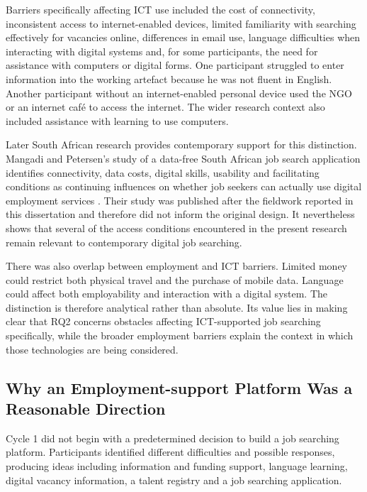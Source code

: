 Barriers specifically affecting ICT use included the cost of connectivity, inconsistent access to internet-enabled devices, limited familiarity with searching effectively for vacancies online, differences in email use, language difficulties when interacting with digital systems and, for some participants, the need for assistance with computers or digital forms. One participant struggled to enter information into the working artefact because he was not fluent in English. Another participant without an internet-enabled personal device used the NGO or an internet café to access the internet. The wider research context also included assistance with learning to use computers.

Later South African research provides contemporary support for this distinction. Mangadi and Petersen's study of a data-free South African job search application identifies connectivity, data costs, digital skills, usability and facilitating conditions as continuing influences on whether job seekers can actually use digital employment services \cite{mangadi2024}. Their study was published after the fieldwork reported in this dissertation and therefore did not inform the original design. It nevertheless shows that several of the access conditions encountered in the present research remain relevant to contemporary digital job searching.

There was also overlap between employment and ICT barriers. Limited money could restrict both physical travel and the purchase of mobile data. Language could affect both employability and interaction with a digital system. The distinction is therefore analytical rather than absolute. Its value lies in making clear that RQ2 concerns obstacles affecting ICT-supported job searching specifically, while the broader employment barriers explain the context in which those technologies are being considered.


\subsection{Why an Employment-support Platform Was a Reasonable Direction}

Cycle 1 did not begin with a predetermined decision to build a job searching platform. Participants identified different difficulties and possible responses, producing ideas including information and funding support, language learning, digital vacancy information, a talent registry and a job searching application.

